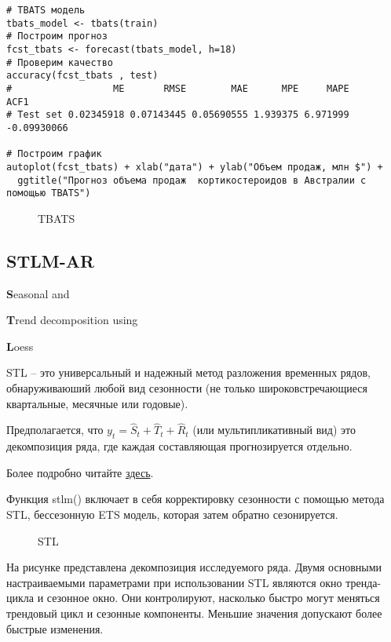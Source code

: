 \documentclass[a4paper,12pt]{article}
\theoremstyle{plain} %
\theoremstyle{definition} %
\theoremstyle{remark} %
\begin{document}
 \begin{verbatim}
# TBATS модель
tbats_model <- tbats(train)
# Построим прогноз
fcst_tbats <- forecast(tbats_model, h=18)
# Проверим качество
accuracy(fcst_tbats , test)
#                  ME       RMSE        MAE      MPE     MAPE        ACF1
# Test set 0.02345918 0.07143445 0.05690555 1.939375 6.971999 -0.09930066

# Построим график
autoplot(fcst_tbats) + xlab("дата") + ylab("Объем продаж, млн $") +
  ggtitle("Прогноз объема продаж  кортикостероидов в Австралии с помощью TBATS")

 \end{verbatim}

\begin{figure}[H]
   \noindent{}
   \caption{TBATS}
   \label{figCurves}
 \end{figure}

\subsection{STLM-AR}

 \textbf{S}easonal and

 \noindent\textbf{T}rend decomposition using

  \noindent\textbf{L}oess


STL -- это универсальный и надежный метод разложения временных рядов, обнаруживаюший любой вид сезонности (не только широковстречающиеся квартальные, месячные или годовые).

Предполагается, что $y_t = \hat{S}_t + \hat{T}_t+\hat{R}_{t}$ (или мультипликативный вид)  это декомпозиция ряда, где  каждая составляющая прогнозируется отдельно.

Более подробно читайте \href{https://otexts.com/fpp2/stl.html}{здесь}.

Функция stlm() включает в себя корректировку сезонности с помощью метода STL, бессезонную  ETS модель, которая затем обратно сезонируется.


\begin{figure}[H]
  \noindent{}
  \caption{STL}
\end{figure}

На рисунке представлена декомпозиция исследуемого ряда.
Двумя основными настраиваемыми параметрами при использовании STL являются окно тренда-цикла  и сезонное окно.
Они контролируют, насколько быстро могут меняться трендовый цикл и сезонные компоненты.
Меньшие значения допускают более быстрые изменения.
\end{document}
